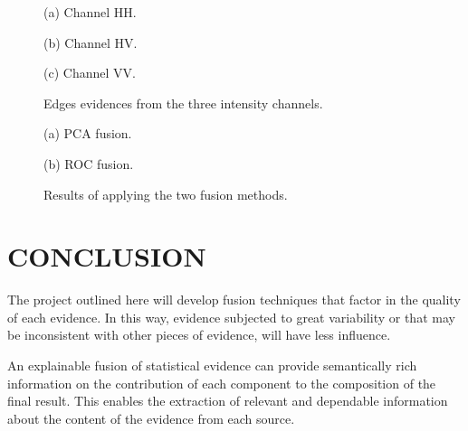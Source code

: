 \documentclass{article}
\begin{document}
 \begin{figure}[htb]
\begin{minipage}[b]{1.0\linewidth}
  \centering
 \centerline{}
  \vspace{-0.1cm}
  \centerline{(a) Channel HH.}\medskip
\end{minipage}
%
\begin{minipage}[b]{.48\linewidth}
  \centering
\centerline{}
  \vspace{-0.1cm}
  \centerline{(b) Channel HV.}\medskip
\end{minipage}
\hfill
\begin{minipage}[b]{0.48\linewidth}
  \centering
 \centerline{}
  \vspace{-0.1cm}
  \centerline{(c) Channel VV.}\medskip
\end{minipage}
%
\caption{Edges evidences from the three intensity channels.}
\label{fig:res}
%
\end{figure}
 \begin{figure}[htb]
\begin{minipage}[b]{.48\linewidth}
  \centering
\centerline{}
  \vspace{-0.1cm}
  \centerline{(a) PCA fusion.}\medskip
\end{minipage}
\hfill
\begin{minipage}[b]{0.48\linewidth}
  \centering
 \centerline{}
  \vspace{-0.1cm}
  \centerline{(b) ROC fusion.}\medskip
\end{minipage}
%
\caption{Results of applying the two fusion methods.}
\label{fig:2}
%
\end{figure}

\section{CONCLUSION}
The project outlined here will develop fusion techniques that factor in the quality of each evidence. In this way, evidence subjected to great variability or that may be inconsistent with other pieces of evidence, will have less influence.

An explainable fusion of statistical evidence can provide semantically rich information on the contribution of each component to the composition of the final result. 
This enables the extraction of relevant and dependable information about the content of the evidence from each source. 
\end{document}

